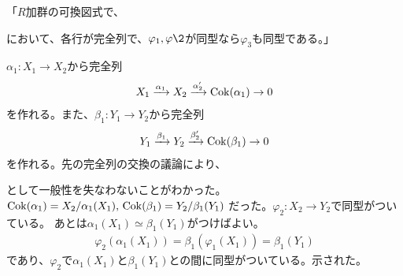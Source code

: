 \documentclass[9pt]{ltjsarticle}
\begin{document}
「$R$加群の可換図式で、
\begin{center}
\end{center}
において、各行が完全列で、$\varphi_1,\varphi\2$が同型なら$\varphi_3$も同型である。」
\begin{myproof}
  $\alpha_1 \colon X_1 \to X_2$から完全列
  \begin{align}
    X_1 \xrightarrow{\alpha_1} X_2 \xrightarrow{\alpha_2'} \mathrm{Cok}(\alpha_1) \to 0
  \end{align}
  を作れる。また、$\beta_1\colon Y_1 \to Y_2$から完全列
  \begin{align}
    Y_1 \xrightarrow{\beta_1} Y_2 \xrightarrow{\beta_2'} \mathrm{Cok}(\beta_1) \to 0
  \end{align}
  を作れる。先の完全列の交換の議論により、
  \begin{center}
  \end{center}
  として一般性を失なわないことがわかった。
  $\mathrm{Cok}(\alpha_1)=X_2/\alpha_1(X_1),\, \mathrm{Cok}(\beta_1)=Y_2/\beta_1(Y_1)$
  だった。$\varphi_2 \colon X_2 \to Y_2$で同型がついている。
  あとは$\alpha_1(X_1)\simeq \beta_1(Y_1)$がつけばよい。
  \begin{align}
    \varphi_2(\alpha_1(X_1))
    =
    \beta_1(\varphi_1(X_1))
    =
    \beta_1(Y_1)
  \end{align}
  であり、$\varphi_2$で$\alpha_1(X_1)$と$\beta_1(Y_1)$との間に同型がついている。示された。
\end{myproof}
\end{document}
